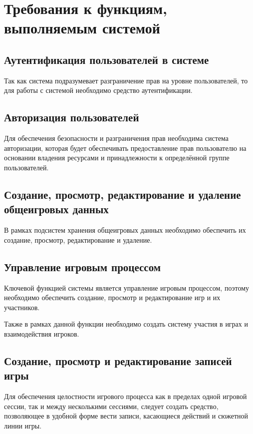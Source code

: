 \section{Требования к функциям, выполняемым системой}


\subsection{Аутентификация пользователей в системе}

Так как система подразумевает разграничение прав на уровне пользователей, то для работы с системой необходимо средство аутентификации.


\subsection{Авторизация пользователей}

Для обеспечения безопасности и разграничения прав необходима система авторизации, которая будет обеспечивать предоставление прав пользователю на основании владения ресурсами и принадлежности к определённой группе пользователей.


\subsection{Создание, просмотр, редактирование и удаление общеигровых данных}

В рамках подсистем хранения общеигровых данных необходимо обеспечить их создание, просмотр, редактирование и удаление.


\subsection{Управление игровым процессом}

Ключевой функцией системы является управление игровым процессом, поэтому необходимо обеспечить создание, просмотр и редактирование игр и их участников.

Также в рамках данной функции необходимо создать систему участия в играх и взаимодействия игроков.


\subsection{Создание, просмотр и редактирование записей игры}

Для обеспечения целостности игрового процесса как в пределах одной игровой сессии, так и между несколькими сессиями, следует создать средство, позволяющее в удобной форме вести записи, касающиеся действий и сюжетной линии игры.


